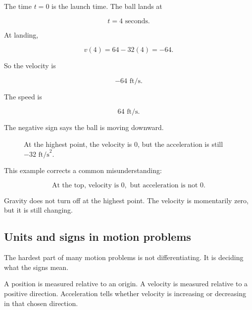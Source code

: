 The time \(t=0\) is the launch time.  The ball lands at

\[
t=4\text{ seconds}.
\]

At landing,

\[
v(4)=64-32(4)=-64.
\]

So the velocity is

\[
-64\text{ ft/s}.
\]

The speed is

\[
64\text{ ft/s}.
\]

The negative sign says the ball is moving downward.

\begin{figure}[h]
\centering
{}
\caption{At the highest point, the velocity is \(0\), but the acceleration is still \(-32\text{ ft/s}^2\).}
\label{fig:thrown-upward}
\end{figure}

This example corrects a common misunderstanding:

\[
\boxed{
\text{At the top, velocity is }0,\text{ but acceleration is not }0.
}
\]

Gravity does not turn off at the highest point.  The velocity is momentarily zero, but it is still changing.

\subsection{Units and signs in motion problems}
\label{subsec:units-signs-motion}

The hardest part of many motion problems is not differentiating.  It is deciding what the signs mean.

A position is measured relative to an origin.  A velocity is measured relative to a positive direction.  Acceleration tells whether velocity is increasing or decreasing in that chosen direction.

